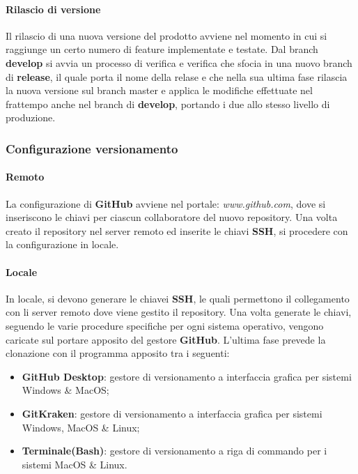 \paragraph{Rilascio di versione}
Il rilascio di una nuova versione del prodotto avviene nel momento in cui si raggiunge un certo numero di feature implementate e testate. 
Dal branch \textbf{develop} si avvia un processo di verifica e verifica che sfocia in una nuovo branch di \textbf{release}, il quale porta il nome della relase e che nella sua ultima fase 
rilascia la nuova versione sul branch master e applica le modifiche effettuate nel frattempo anche nel branch di \textbf{develop}, portando i due allo stesso livello di produzione. 

\subsubsection{Configurazione versionamento}

\paragraph{Remoto}

	La configurazione di \textbf{GitHub} avviene nel portale: \textit{www.github.com}, dove si inseriscono le chiavi  per ciascun collaboratore del nuovo repository. 
	Una volta creato il repository nel server remoto ed inserite le chiavi \textbf{SSH}, si procedere con la configurazione in locale.
	
\paragraph{Locale}

	In locale, si devono generare le chiavei \textbf{SSH}, le quali permettono il collegamento con li server remoto dove viene gestito il repository. 
	Una volta generate le chiavi, seguendo le varie procedure specifiche per ogni sistema operativo, vengono caricate sul portare apposito del gestore \textbf{GitHub}.
	L'ultima fase prevede la clonazione con il programma apposito tra i seguenti: 

	\begin{itemize}
		\item \textbf{GitHub Desktop}: gestore di versionamento a interfaccia grafica per sistemi Windows \& MacOS; 
		\item \textbf{GitKraken}: gestore di versionamento a interfaccia grafica per sistemi Windows, MacOS \& Linux; 		
		\item \textbf{Terminale(Bash)}: gestore di versionamento a riga di commando per i sistemi MacOS \& Linux.
	\end{itemize}
		
